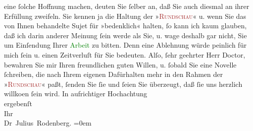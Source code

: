                     eine ſolche Hoffnung machen, deuten Sie ſelber an, daß Sie auch diesmal an ihrer
                    Erfüllung zweifeln. Sie kennen ja die Haltung der »\textcolor{brown}{\textsc{Rundschau}}{}\ledrightnote{\textcolor{brown}{Deutsche Rundschau}}« u. wenn Sie das von Ihnen behandelte Sujet für »bedenklich« halten, ſo
                    kann ich kaum glauben, daß ich darin anderer Meinung ſein werde als Sie, u. wage
                    deshalb {\pb}gar
                    nicht, Sie um Einſendung Ihrer \textcolor{green}{Arbeit}{} zu bitten. Denn eine Ablehnung würde peinlich für mich ſein u.
                    einen Zeitverluſt für Sie bedeuten. Alſo, ſehr geehrter Herr Doctor, bewahren
                    Sie mir Ihren freundlichen guten Willen, u. ſobald Sie eine Novelle ſchreiben,
                    die nach Ihrem eigenen Dafürhalten mehr in den Rahmen der »\textcolor{brown}{\textsc{Rundschau}}{}\ledrightnote{\textcolor{brown}{Deutsche Rundschau}}« paßt, ſenden Sie ſie und ſeien Sie überzeugt, daß ſie uns herzlich
                        willko{\geminationm}en ſein wird.\pend
           \pstart
           In aufrichtiger Hochachtung{\\[\baselineskip]}ergebenſt{\\[\baselineskip]}Ihr{\\[\baselineskip]}\spacefill\mbox{Dr Julius Rodenberg.}\pend
           \leftskip=0em{}\endnumbering{}  
      